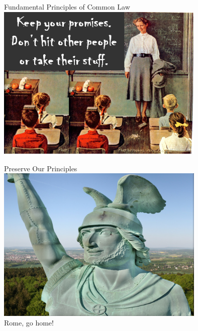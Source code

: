 \documentclass{beamer}
\begin{document}
\begin{frame}{Fundamental Principles of Common Law}
    \centering
    \includegraphics[width=0.75\textwidth]{img/schoolroom.png} \\
\end{frame}

\begin{frame}{Preserve Our Principles}
    \centering
    \includegraphics[width=0.75\textwidth]{img/herman3.png} \\
    Rome, go home! \\
\end{frame}
\end{document}
